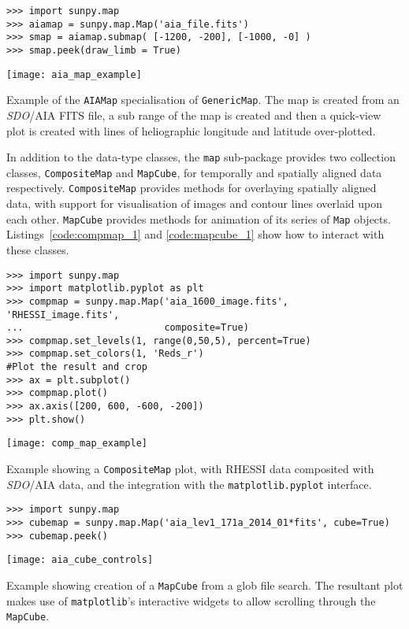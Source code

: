 \begin{listing}[H]
\begin{verbatim}
>>> import sunpy.map
>>> aiamap = sunpy.map.Map('aia_file.fits')
>>> smap = aiamap.submap( [-1200, -200], [-1000, -0] )
>>> smap.peek(draw_limb = True)
\end{verbatim}
\begin{center}
\texttt{[image: aia\_map\_example]}
\end{center}
\caption{Example of the \texttt{AIAMap} specialisation of 
\texttt{GenericMap}. The map is created from an \textit{SDO}/AIA FITS file, a sub range
of the map is created and then a quick-view plot is created with lines of heliographic longitude and latitude over-plotted.}
\label{code:aia_1}
\end{listing}

In addition to the data-type classes, the \texttt{map} sub-package provides two 
collection classes, \texttt{CompositeMap} and \texttt{MapCube}, for 
temporally and spatially aligned data respectively.
\texttt{CompositeMap} provides methods for overlaying spatially aligned 
data, with support for visualisation of images and contour lines overlaid 
upon each other.
\texttt{MapCube} provides methods for animation of its series of \texttt{Map} 
objects. Listings~\ref{code:compmap_1} and \ref{code:mapcube_1} show how to 
interact with these classes.

\begin{listing}[H]
\begin{verbatim}
>>> import sunpy.map
>>> import matplotlib.pyplot as plt
>>> compmap = sunpy.map.Map('aia_1600_image.fits', 'RHESSI_image.fits', 
...                         composite=True)
>>> compmap.set_levels(1, range(0,50,5), percent=True)
>>> compmap.set_colors(1, 'Reds_r')
#Plot the result and crop
>>> ax = plt.subplot()
>>> compmap.plot()
>>> ax.axis([200, 600, -600, -200])
>>> plt.show()
\end{verbatim}
\begin{center}
\texttt{[image: comp\_map\_example]}
\end{center}
\caption{Example showing a \texttt{CompositeMap} plot, with RHESSI data composited
with \textit{SDO}/AIA data, and the integration with the \texttt{matplotlib.pyplot} interface.}
\label{code:compmap_1}
\end{listing}

\begin{listing}[H]
\begin{verbatim}
>>> import sunpy.map
>>> cubemap = sunpy.map.Map('aia_lev1_171a_2014_01*fits', cube=True)
>>> cubemap.peek()
\end{verbatim}
\begin{center}
\texttt{[image: aia\_cube\_controls]}
\end{center}
\caption{Example showing creation of a \texttt{MapCube} from a glob file search. The 
resultant plot makes use of \texttt{matplotlib}'s interactive widgets to allow scrolling 
through the \texttt{MapCube}.}
\label{code:mapcube_1}
\end{listing}